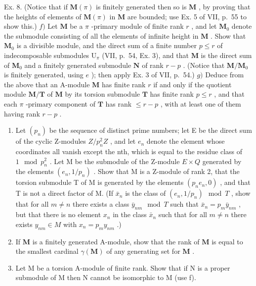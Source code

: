 Ex. 8. (Notice that if \(\mathbf{M}(\pi)\) is finitely generated then so is \(\mathbf{M}\) , by proving that the heights of elements of \(\mathbf{M}(\pi)\) in \(\mathbf{M}\) are bounded; use Ex. 5 of VII, p.~55 to show this.) \(f)\) Let \(\mathbf{M}\) be a \(\pi\) -primary module of finite rank \(r\) , and let \(\mathbf{M}_0\) denote the submodule consisting of all the elements of infinite height in \(\mathbf{M}\) . Show that \(\mathbf{M}_0\) is a divisible module, and the direct sum of a finite number \(p \leqslant r\) of indecomposable submodules \(\mathrm{U}_{\pi}\) (VII, p.~54, Ex. 3), and that \(\mathbf{M}\) is the direct sum of \(\mathbf{M}_0\) and a finitely generated submodule \(\mathbf{N}\) of rank \(r - p\) . (Notice that \(\mathbf{M} / \mathbf{M}_0\) is finitely generated, using \(e\) ); then apply Ex. 3 of VII, p.~54.) \(g)\) Deduce from the above that an A-module \(\mathbf{M}\) has finite rank \(r\) if and only if the quotient module \(\mathbf{M} / \mathbf{T}\) of \(\mathbf{M}\) by its torsion submodule \(\mathbf{T}\) has finite rank \(p \leqslant r\) , and that each \(\pi\) -primary component of \(\mathbf{T}\) has rank \(\leqslant r - p\) , with at least one of them having rank \(r - p\) .

\begin{enumerate}
\def\labelenumi{\alph{enumi})}
\setcounter{enumi}{7}
\item
  Let \((p_{n})\) be the sequence of distinct prime numbers; let E be the direct sum of the cyclic Z-modules \(Z/p_{n}^{2}Z\) , and let \(e_{n}\) denote the element whose coordinates all vanish except the nth, which is equal to the residue class of \(1 \mod p_{n}^{2}\) . Let M be the submodule of the Z-module \(E \times Q\) generated by the elements \((e_{n}, 1/p_{n})\) . Show that M is a Z-module of rank 2, that the torsion submodule T of M is generated by the elements \((p_{n}e_{n}, 0)\) , and that T is not a direct factor of M. (If \(\bar{x}_{n}\) is the class of \((e_{n}, 1/p_{n}) \mod T\) , show that for all \(m \neq n\) there exists a class \(\bar{y}_{nm} \mod T\) such that \(\bar{x}_{n} = p_{m}\bar{y}_{nm}\) , but that there is no element \(x_{n}\) in the class \(\bar{x}_{n}\) such that for all \(m \neq n\) there exists \(y_{nm} \in M\) with \(x_{n} = p_{m}y_{nm}\) .)
\item
  If \(\mathbf{M}\) is a finitely generated A-module, show that the rank of \(\mathbf{M}\) is equal to the smallest cardinal \(\gamma (\mathbf{M})\) of any generating set for \(\mathbf{M}\) .
\item
  Let M be a torsion A-module of finite rank. Show that if N is a proper submodule of M then N cannot be isomorphic to M (use f).
\end{enumerate}

